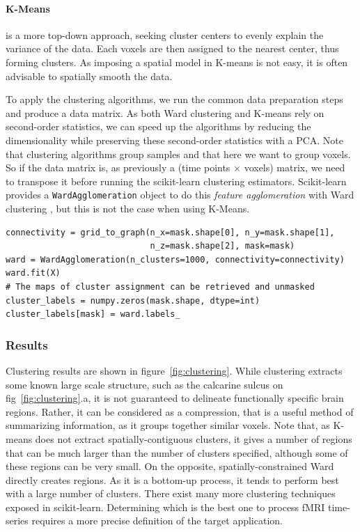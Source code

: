 \documentclass{frontiersSCNS} %
\begin{document}
\paragraph{K-Means} is a more top-down approach, seeking cluster centers
to evenly explain the variance of the data. Each voxels are then assigned
to the nearest center, thus forming clusters. As imposing a spatial model
in K-means is not easy, it is often advisable to spatially smooth the
data.

To apply the clustering algorithms, we run the common data preparation
steps and produce a data matrix. As both Ward clustering and K-means rely
on second-order statistics, we can speed up the algorithms by reducing
the dimensionality while preserving these second-order statistics with a
PCA. Note that clustering algorithms group samples and that here we want
to group voxels. So if the data matrix is, as previously a (time points
$\times$ voxels) matrix, we need to transpose it before running the
scikit-learn clustering estimators. Scikit-learn provides a
\texttt{WardAgglomeration} object to do this \emph{feature agglomeration}
with Ward clustering \citep{michel2012supervisedclustering}, but this is
not the case when using K-Means.

\begin{lstlisting}
connectivity = grid_to_graph(n_x=mask.shape[0], n_y=mask.shape[1],
                             n_z=mask.shape[2], mask=mask)
ward = WardAgglomeration(n_clusters=1000, connectivity=connectivity)
ward.fit(X)
# The maps of cluster assignment can be retrieved and unmasked
cluster_labels = numpy.zeros(mask.shape, dtype=int)
cluster_labels[mask] = ward.labels_
\end{lstlisting}

\subsubsection{Results}

Clustering results are shown in figure~\ref{fig:clustering}. While
clustering extracts some known large scale structure, such as the
calcarine sulcus on fig~\ref{fig:clustering}.a, it is not guaranteed to
delineate functionally specific brain regions. Rather, it can be considered as a compression, that
is a useful method of summarizing information, as it groups together
similar voxels. Note that, as K-means does not extract spatially-contiguous
clusters, it gives a number of regions that can be much larger than the
number of clusters specified, although some of these regions can be very
small. On the opposite, spatially-constrained Ward directly creates regions.
As it is a bottom-up process, it tends to perform best
with a large number of clusters. There exist many more clustering
techniques exposed in scikit-learn. Determining which is the best one to
process fMRI time-series requires a more precise definition of the target
application.
\end{document}
